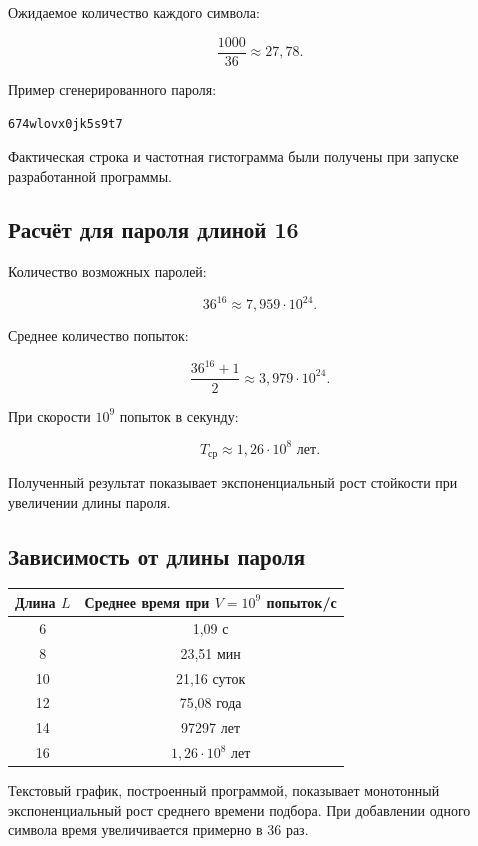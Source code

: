 \documentclass[a4paper,14pt,oneside]{extarticle}
\begin{document}
Ожидаемое количество каждого символа:

\[
\frac{1000}{36}\approx27{,}78.
\]

Пример сгенерированного пароля:

\begin{center}
\texttt{674wlovx0jk5s9t7}
\end{center}

Фактическая строка и частотная гистограмма были получены при запуске
разработанной программы.

\subsection{Расчёт для пароля длиной 16}

Количество возможных паролей:

\[
36^{16}\approx7{,}959\cdot10^{24}.
\]

Среднее количество попыток:

\[
\frac{36^{16}+1}{2}\approx3{,}979\cdot10^{24}.
\]

При скорости $10^9$ попыток в секунду:

\[
T_{\text{ср}}\approx1{,}26\cdot10^8\text{ лет}.
\]

Полученный результат показывает экспоненциальный рост стойкости при
увеличении длины пароля.

\subsection{Зависимость от длины пароля}

\begin{center}
\begin{tabular}{|c|c|}
\hline
\textbf{Длина $L$} & \textbf{Среднее время при $V=10^9$ попыток/с}\\
\hline
6 & 1,09 с\\
\hline
8 & 23,51 мин\\
\hline
10 & 21,16 суток\\
\hline
12 & 75,08 года\\
\hline
14 & 97297 лет\\
\hline
16 & $1{,}26\cdot10^8$ лет\\
\hline
\end{tabular}
\end{center}

Текстовый график, построенный программой, показывает монотонный
экспоненциальный рост среднего времени подбора. При добавлении одного
символа время увеличивается примерно в 36 раз.
\end{document}

